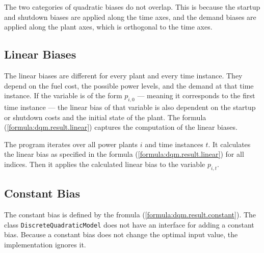 The two categories of quadratic biases do not overlap.
This is because the startup and shutdown biases are applied along the time axes,
and the demand biases are applied along the plant axes, which is orthogonal to the time axes.

\subsection*{Linear Biases}
\label{approach:annealing.implement.dqm.linear}

The linear biases are different for every plant and every time instance.
They depend on the fuel cost, the possible power levels, and the demand at that time instance.
If the variable is of the form $p_{i, 0}$ --- meaning it corresponds to the first time instance --- the linear bias of that variable is also dependent on the startup or shutdown costs and the initial state of the plant.
The formula (\ref{formula:dqm.result.linear}) captures the computation of the linear biases.

The program iterates over all power plants $i$ and time instances $t$.
It calculates the linear bias as specified in the formula (\ref{formula:dqm.result.linear}) for all indices.
Then it applies the calculated linear bias to the variable $p_{i, t}$.

\subsection*{Constant Bias}

The constant bias is defined by the fromula (\ref{formula:dqm.result.constant}).
The class \texttt{DiscreteQuadraticModel} does not have an interface for adding a constant bias.
Because a constant bias does not change the optimal input value, the implementation ignores it.

